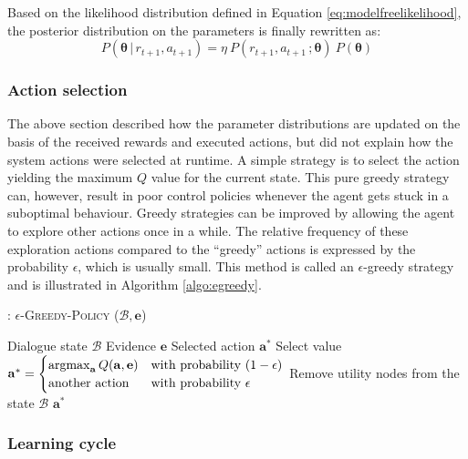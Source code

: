 Based on the likelihood distribution defined in Equation \eqref{eq:modelfreelikelihood}, the posterior distribution on the parameters is finally rewritten as: 
\begin{equation}
P(\boldsymbol\theta \, | \, r_{t+1}, a_{t+1}) = \eta \ P(r_{t+1}, a_{t+1} \,; \boldsymbol\theta)  \ P(\boldsymbol\theta)  \label{eq:posteriormodelfree}
\end{equation}


\subsubsection*{Action selection}

The above section described how the parameter distributions are updated on the basis of the received rewards and executed actions, but did not explain how the system actions were selected at runtime.  A simple strategy is to select the action yielding the maximum $Q$ value for the current state.  This pure greedy strategy can, however, result in poor control policies whenever the agent gets stuck in a suboptimal behaviour.  Greedy strategies can be improved by allowing the agent to explore other actions once in a while. The relative frequency of these exploration actions compared to the  ``greedy'' actions is expressed by the probability $\epsilon$, which is usually small. This method is called an $\epsilon$-greedy strategy and is illustrated in Algorithm \ref{algo:egreedy}.

\begin{algorithm}[h!]
\caption{: \textsc{$\epsilon$-Greedy-Policy} ($\mathcal{B}, \mathbf{e}$)}
\begin{algorithmic}[1] \vspace{1mm}
\REQUIRE Dialogue state $\mathcal{B}$
\REQUIRE Evidence $\mathbf{e}$
\ENSURE Selected action $\mathbf{a}^*$
\STATE Select value $\mathbf{a}^* = \begin{cases} \argmax_{\mathbf{a}} Q(\mathbf{a}, \mathbf{e}) & \text{with probability } (1- \epsilon) \\ \text{another action} & \text{with probability } \epsilon \end{cases}$
\STATE Remove utility nodes from the state $\mathcal{B}$
\RETURN $\mathbf{a}^*$
\end{algorithmic}
\label{algo:egreedy}
\end{algorithm}

\subsubsection*{Learning cycle}

